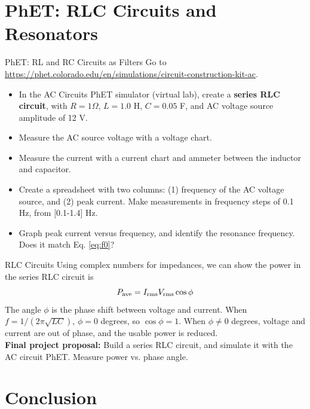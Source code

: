 \documentclass{beamer}
\begin{document}
\section{PhET: RLC Circuits and Resonators}

\begin{frame}{PhET: RL and RC Circuits as Filters}
\footnotesize
Go to \url{https://phet.colorado.edu/en/simulations/circuit-construction-kit-ac}.
\begin{itemize}
\footnotesize
\item In the AC Circuits PhET simulator (virtual lab), create a \textbf{\alert{series RLC circuit}}, with $R = 1 \Omega$, $L = 1.0$ H, $C = 0.05$ F, and AC voltage source amplitude of 12 V.
\item Measure the AC source voltage with a voltage chart.
\item Measure the current with a current chart and ammeter between the inductor and capacitor.
\item Create a spreadsheet with two columns: (1) frequency of the AC voltage source, and (2) peak current.  Make measurements in frequency steps of 0.1 Hz, from [0.1-1.4] Hz.
\item Graph peak current versus frequency, and identify the resonance frequency.  Does it match Eq. \ref{eq:f0}?
\end{itemize}
\end{frame}

\begin{frame}{RLC Circuits}
Using complex numbers for impedances, we can show the power in the series RLC circuit is
\begin{equation}
P_{\rm ave} = I_{\rm rms} V_{\rm rms} \cos\phi
\end{equation}
The angle $\phi$ is the phase shift between voltage and current.  When $f = 1/(2\pi\sqrt{LC})$, $\phi = 0$ degrees, so $\cos\phi = 1$.  When $\phi \neq 0$ degrees, voltage and current are out of phase, and the usable power is reduced. \\ \vspace{1cm}
\textbf{\alert{Final project proposal:}} Build a series RLC circuit, and simulate it with the AC circuit PhET.  Measure power vs. phase angle.
\end{frame}

\section{Conclusion}
\end{document}
